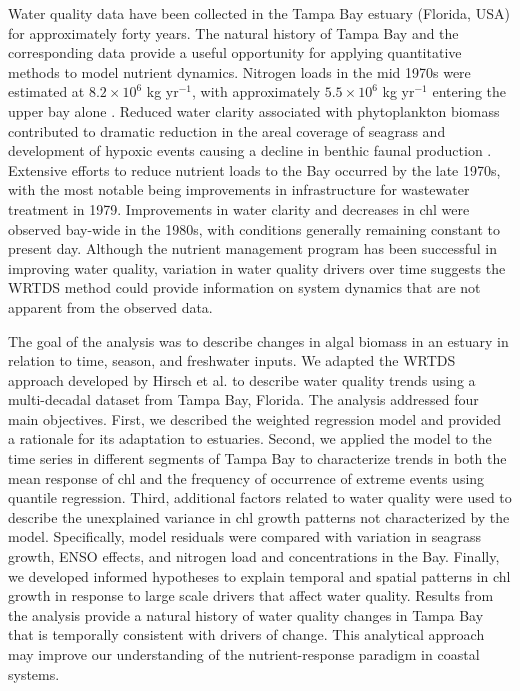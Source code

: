 \documentclass{svjour3}\usepackage[]{graphicx}\usepackage[]{color}
\begin{document}
Water quality data have been collected in the Tampa Bay estuary (Florida, USA) for approximately forty years.  The natural history of Tampa Bay and the corresponding data provide a useful opportunity for applying quantitative methods to model nutrient dynamics. Nitrogen loads in the mid 1970s were estimated at $8.2 \times 10^6$ kg yr$^{-1}$, with approximately $5.5 \times 10^6$ kg yr$^{-1}$ entering the upper bay alone \cite{Poe05,Greening06}.  Reduced water clarity associated with phytoplankton biomass contributed to dramatic reduction in the areal coverage of seagrass \cite{Tomasko05} and development of hypoxic events causing a decline in benthic faunal production \cite{Santos80}.  Extensive efforts to reduce nutrient loads to the Bay occurred by the late 1970s, with the most notable being improvements in infrastructure for wastewater treatment in 1979.  Improvements in water clarity and decreases in \ac{chl} were observed bay-wide in the 1980s, with conditions generally remaining constant to present day. Although the nutrient management program has been successful in improving water quality, variation in water quality drivers over time suggests the \ac{WRTDS} method could provide information on system dynamics that are not apparent from the observed data.

The goal of the analysis was to describe changes in algal biomass in an estuary in relation to time, season, and freshwater inputs.  We adapted the \ac{WRTDS} approach developed by Hirsch et al. \cite{Hirsch10} to describe water quality trends using a multi-decadal dataset from Tampa Bay, Florida. The analysis addressed four main objectives.  First, we described the weighted regression model and provided a rationale for its adaptation to estuaries.  Second, we applied the model to the time series in different segments of Tampa Bay to characterize trends in both the mean response of \ac{chl} and the frequency of occurrence of extreme events using quantile regression.  Third, additional factors related to water quality were used to describe the unexplained variance in \ac{chl} growth patterns not characterized by the model.  Specifically, model residuals were compared with variation in seagrass growth, \ac{ENSO} effects, and nitrogen load and concentrations in the Bay.  Finally, we developed informed hypotheses to explain temporal and spatial patterns in \ac{chl} growth in response to large scale drivers that affect water quality.  Results from the analysis provide a natural history of water quality changes in Tampa Bay that is temporally consistent with drivers of change.  This analytical approach may improve our understanding of the nutrient-response paradigm in coastal systems.  
\end{document}

